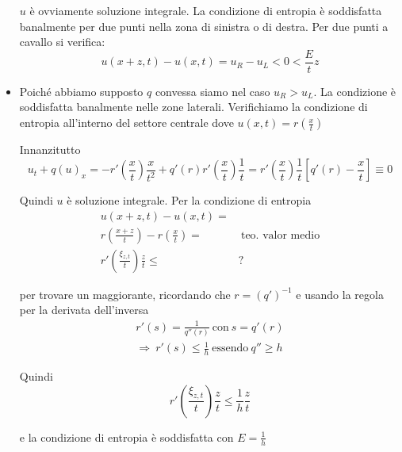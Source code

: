 \documentclass[10pt,a4paper,twoside,openright]{book}
\begin{document}
\begin{dimostrazione}
\begin{itemize}
\begin{figure}[H]
\begin{tikzpicture}[x=0.75pt,y=0.75pt,yscale=-1,xscale=1]
		\end{tikzpicture}
	\end{figure}
	\FloatBarrier


	$\displaystyle u$ è ovviamente soluzione integrale. La condizione di entropia è soddisfatta banalmente per due punti nella zona di sinistra o di destra. Per due punti a cavallo si verifica:
	\begin{equation*}
		u( x+z,t) -u( x,t) =u_{R} -u_{L} < 0< \frac{E}{t} z
	\end{equation*}
	\item Poiché abbiamo supposto $\displaystyle q$ convessa siamo nel caso $\displaystyle u_{R}  >u_{L}$. La condizione è soddisfatta banalmente nelle zone laterali. Verifichiamo la condizione di entropia all'interno del settore centrale dove $\displaystyle u( x,t) =r\left(\frac{x}{t}\right)$

	Innanzitutto 
	\begin{equation*}
		u_{t} +q( u)_{x} =-r'\left(\frac{x}{t}\right)\frac{x}{t^{2}} +q'( r) r'\left(\frac{x}{t}\right)\frac{1}{t} =r'\left(\frac{x}{t}\right)\frac{1}{t}\left[ q'( r) -\frac{x}{t}\right] \equiv 0
	\end{equation*}

	Quindi $\displaystyle u$ è soluzione integrale. Per la condizione di entropia
	\begin{align*}
		u( x+z,t) -u( x,t) = & \\
		r\left(\frac{x+z}{t}\right) -r\left(\frac{x}{t}\right) = & \ \text{teo. valor medio}\\
		r'\left(\frac{\xi _{z,t}}{t}\right)\frac{z}{t} \leqslant  & ?
	\end{align*}

	per trovare un maggiorante, ricordando che $\displaystyle r=( q')^{-1}$ e usando la regola per la derivata dell'inversa\begin{gather*}
	r'( s) =\frac{1}{q''( r)} \ \text{con} \ s=q'( r)\\
	\Rightarrow \ r'( s) \leqslant \frac{1}{h} \ \text{essendo} \ q''\geqslant h
	\end{gather*}

	Quindi
	\begin{equation*}
		r'\left(\frac{\xi _{z,t}}{t}\right)\frac{z}{t} \leqslant \frac{1}{h}\frac{z}{t}
	\end{equation*}

	e la condizione di entropia è soddisfatta con $\displaystyle E=\frac{1}{h}$
\end{itemize}

\end{dimostrazione}
\end{document}
